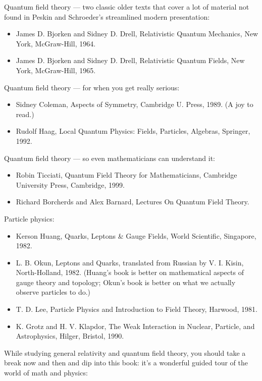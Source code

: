 \documentclass[10pt,a4paper]{book}
\theoremstyle{definition}
\begin{document}
Quantum field theory — two classic older texts that cover a lot of material not found in Peskin and Schroeder's streamlined modern presentation:
\begin{itemize}
\item  James D. Bjorken and Sidney D. Drell, Relativistic Quantum Mechanics, New York, McGraw-Hill, 1964.
\item James D. Bjorken and Sidney D. Drell, Relativistic Quantum Fields, New York, McGraw-Hill, 1965.
\end{itemize}

Quantum field theory — for when you get really serious:
\begin{itemize}
\item  Sidney Coleman, Aspects of Symmetry, Cambridge U. Press, 1989. (A joy to read.)
\item Rudolf Haag, Local Quantum Physics: Fields, Particles, Algebras, Springer, 1992.
\end{itemize}

Quantum field theory — so even mathematicians can understand it:

\begin{itemize}
\item  Robin Ticciati, Quantum Field Theory for Mathematicians, Cambridge University Press, Cambridge, 1999.
\item Richard Borcherds and Alex Barnard, Lectures On Quantum Field Theory.
\end{itemize}

Particle physics:

\begin{itemize}
\item  Kerson Huang, Quarks, Leptons \& Gauge Fields, World Scientific, Singapore, 1982.
\item L. B. Okun, Leptons and Quarks, translated from Russian by V. I. Kisin, North-Holland, 1982. (Huang's book is better on mathematical aspects of gauge theory and topology; Okun's book is better on what we actually observe particles to do.)
\item T. D. Lee, Particle Physics and Introduction to Field Theory, Harwood, 1981.
\item K. Grotz and H. V. Klapdor, The Weak Interaction in Nuclear, Particle, and Astrophysics, Hilger, Bristol, 1990.
\end{itemize}


While studying general relativity and quantum field theory, you should take a break now and then and dip into this book: it's a wonderful guided tour of the world of math and physics:
\end{document}
